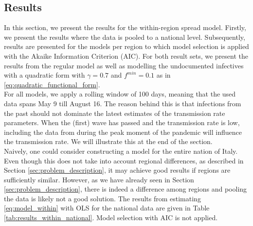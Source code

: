 \documentclass[12pt]{article}
\begin{document}
    \subsection{Results} \label{subsec:results_within}
	In this section, we present the results for the within-region spread model. Firstly, we present the results where the data is pooled to a national level. Subsequently, results are presented for the models per region to which model selection is applied with the Akaike Information Criterion (AIC). For both result sets, we present the results from the regular model as well as modelling the undocumented infectives with a quadratic form with $\gamma = 0.7$ and $f^{min} = 0.1$ as in \eqref{eq:quadratic_functional_form}. \\
	
	For all models, we apply a rolling window of 100 days, meaning that the used data spans May 9 till August 16. The reason behind this is that infections from the past should not dominate the latest estimates of the transmission rate parameters. When the (first) wave has passed and the transmission rate is low, including the data from during the peak moment of the pandemic will influence the transmission rate. We will illustrate this at the end of the section. \\
	
	Naively, one could consider constructing a model for the entire nation of Italy. Even though this does not take into account regional differences, as described in Section \ref{sec:problem_description}, it may achieve good results if regions are sufficiently similar. However, as we have already seen in Section \ref{sec:problem_description}, there is indeed a difference among regions and pooling the data is likely not a good solution. The results from estimating \eqref{eq:model_within} with OLS for the national data are given in Table \ref{tab:results_within_national}. Model selection with AIC is not applied.
	
\end{document}
